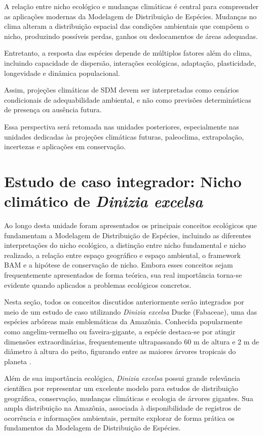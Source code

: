 A relação entre nicho ecológico e mudanças climáticas é central para compreender as aplicações modernas da Modelagem de Distribuição de Espécies. Mudanças no clima alteram a distribuição espacial das condições ambientais que compõem o nicho, produzindo possíveis perdas, ganhos ou deslocamentos de áreas adequadas.

Entretanto, a resposta das espécies depende de múltiplos fatores além do clima, incluindo capacidade de dispersão, interações ecológicas, adaptação, plasticidade, longevidade e dinâmica populacional.

Assim, projeções climáticas de SDM devem ser interpretadas como cenários condicionais de adequabilidade ambiental, e não como previsões determinísticas de presença ou ausência futura.

Essa perspectiva será retomada nas unidades posteriores, especialmente nas unidades dedicadas às projeções climáticas futuras, paleoclima, extrapolação, incertezas e aplicações em conservação.

\section{Estudo de caso integrador: Nicho climático de \textit{Dinizia excelsa}}

Ao longo desta unidade foram apresentados os principais conceitos ecológicos que fundamentam a Modelagem de Distribuição de Espécies, incluindo as diferentes interpretações do nicho ecológico, a distinção entre nicho fundamental e nicho realizado, a relação entre espaço geográfico e espaço ambiental, o framework BAM e a hipótese de conservação de nicho. Embora esses conceitos sejam frequentemente apresentados de forma teórica, sua real importância torna-se evidente quando aplicados a problemas ecológicos concretos.

Nesta seção, todos os conceitos discutidos anteriormente serão integrados por meio de um estudo de caso utilizando \textit{Dinizia excelsa} Ducke (Fabaceae), uma das espécies arbóreas mais emblemáticas da Amazônia. Conhecida popularmente como angelim-vermelho ou faveira-gigante, a espécie destaca-se por atingir dimensões extraordinárias, frequentemente ultrapassando 60 m de altura e 2 m de diâmetro à altura do peito, figurando entre as maiores árvores tropicais do planeta \parencite{tersteege2013,feldpausch2016}.

Além de sua importância ecológica, \textit{Dinizia excelsa} possui grande relevância científica por representar um excelente modelo para estudos de distribuição geográfica, conservação, mudanças climáticas e ecologia de árvores gigantes. Sua ampla distribuição na Amazônia, associada à disponibilidade de registros de ocorrência e informações ambientais, permite explorar de forma prática os fundamentos da Modelagem de Distribuição de Espécies.

